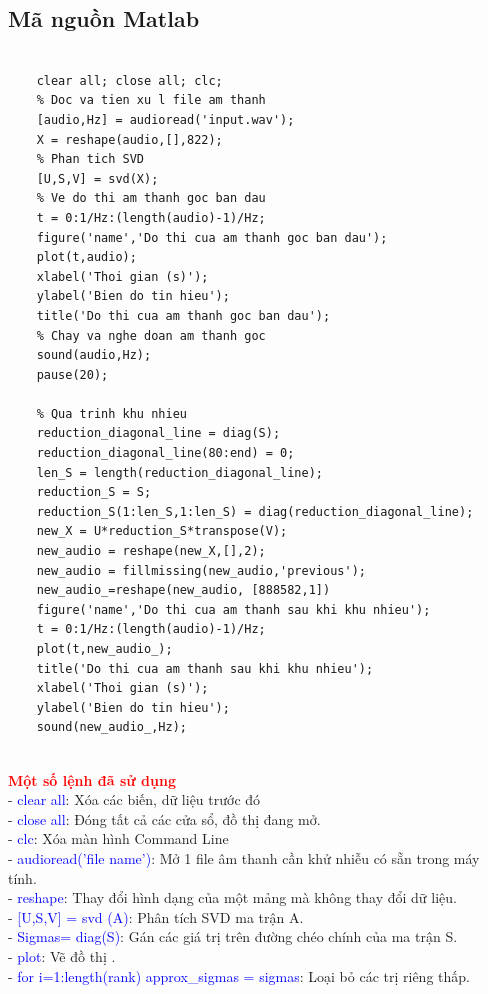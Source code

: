 \subsection{Mã nguồn Matlab}
\begin{lstlisting}
	
	clear all; close all; clc;
	% Doc va tien xu l file am thanh
	[audio,Hz] = audioread('input.wav');
	X = reshape(audio,[],822);
	% Phan tich SVD
	[U,S,V] = svd(X);
	% Ve do thi am thanh goc ban dau
	t = 0:1/Hz:(length(audio)-1)/Hz;
	figure('name','Do thi cua am thanh goc ban dau');
	plot(t,audio);
	xlabel('Thoi gian (s)');
	ylabel('Bien do tin hieu');
	title('Do thi cua am thanh goc ban dau');
	% Chay va nghe doan am thanh goc
	sound(audio,Hz);
	pause(20);
	
	% Qua trinh khu nhieu
	reduction_diagonal_line = diag(S);
	reduction_diagonal_line(80:end) = 0;
	len_S = length(reduction_diagonal_line);
	reduction_S = S;
	reduction_S(1:len_S,1:len_S) = diag(reduction_diagonal_line);
	new_X = U*reduction_S*transpose(V);
	new_audio = reshape(new_X,[],2);
	new_audio = fillmissing(new_audio,'previous');
	new_audio_=reshape(new_audio, [888582,1])
	figure('name','Do thi cua am thanh sau khi khu nhieu');
	t = 0:1/Hz:(length(audio)-1)/Hz;
	plot(t,new_audio_);
	title('Do thi cua am thanh sau khi khu nhieu');
	xlabel('Thoi gian (s)');
	ylabel('Bien do tin hieu');
	sound(new_audio_,Hz);

\end{lstlisting}
\\
\textbf{\textcolor{red}{Một số lệnh đã sử dụng}}\\
- \textcolor{blue}{clear all}: Xóa các biến, dữ liệu trước đó\\
- \textcolor{blue}{close all}: Đóng tất cả các cửa sổ, đồ thị đang mở.\\
- \textcolor{blue}{clc}: Xóa màn hình Command Line\\
- \textcolor{blue}{audioread('file name')}: Mở 1 file âm thanh cần khử nhiễu có sẵn trong máy tính.\\
- \textcolor{blue}{reshape}: Thay đổi hình dạng của một mảng mà không thay đổi dữ liệu.\\
- \textcolor{blue}{[U,S,V] = svd (A)}:  Phân tích SVD ma trận A.\\
- \textcolor{blue}{Sigmas= diag(S)}: Gán các giá trị trên đường chéo chính của ma trận S.\\
- \textcolor{blue}{plot}: Vẽ đồ thị .\\
- \textcolor{blue}{for i=1:length(rank) approx\_sigmas = sigmas}: Loại bỏ các trị riêng thấp.\\
